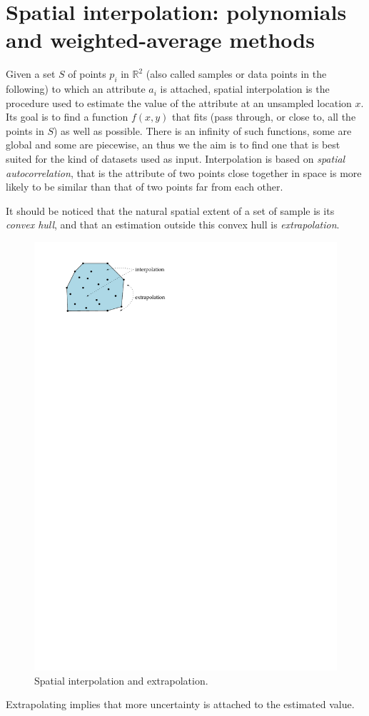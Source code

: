
\graphicspath{{interpol/}}

\chapter{Spatial interpolation: polynomials and weighted-average methods}%
\label{chap:interpol}


Given a set $S$ of points $p_i$ in $\mathbb{R}^2$ (also called samples or data points in the following) to which an attribute $a_i$ is attached, spatial interpolation is the procedure used to estimate the value of the attribute at an unsampled location $x$. 
Its goal is to find a function $f(x,y)$ that fits (pass through, or close to, all the points in $S$) as well as possible. 
There is an infinity of such functions, some are global and some are piecewise, an thus we the aim is to find one that is best suited for the kind of datasets used as input.
Interpolation is based on \emph{spatial autocorrelation}, that is the attribute of two points close together in space is more likely to be similar than that of two points far from each other.

%

It should be noticed that the natural spatial extent of a set of sample is its \emph{convex hull}, and that an estimation outside this convex hull is \emph{extrapolation}.
\begin{figure}
  \centering
  \includegraphics[width=0.4\linewidth]{figs/extrapolation}
  \caption{Spatial interpolation and extrapolation.}
\label{fig:extrapolation}
\end{figure}
Extrapolating implies that more uncertainty is attached to the estimated value.

%


